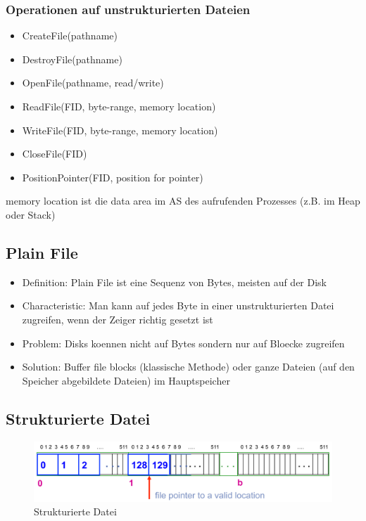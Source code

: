 \documentclass[a4paper]{scrreprt}
\begin{document}
\subsubsection{Operationen auf unstrukturierten Dateien}
\begin{itemize}
	\item CreateFile(pathname)
	\item DestroyFile(pathname)
	\item OpenFile(pathname, read/write)
	\item ReadFile(FID, byte-range, memory location)
	\item WriteFile(FID, byte-range, memory location)
	\item CloseFile(FID)
	\item PositionPointer(FID, position for pointer)
\end{itemize}

memory location ist die data area im AS des aufrufenden Prozesses (z.B. im Heap oder Stack)

\subsection{Plain File}
\begin{itemize}
	\item Definition: Plain File ist eine Sequenz von Bytes, meisten auf der Disk
	\item Characteristic: Man kann auf jedes Byte in einer unstrukturierten Datei zugreifen, wenn der Zeiger richtig gesetzt ist
	\item Problem: Disks koennen nicht auf Bytes sondern nur auf Bloecke zugreifen
	\item Solution: Buffer file blocks (klassische Methode) oder ganze Dateien (auf den Speicher abgebildete Dateien) im Hauptspeicher
\end{itemize}

\subsection{Strukturierte Datei}

\begin{figure}[ht]
\centering
\includegraphics[scale=0.2]{graphics/structured_file.png}
\caption{Strukturierte Datei}
\end{figure}
\end{document}
